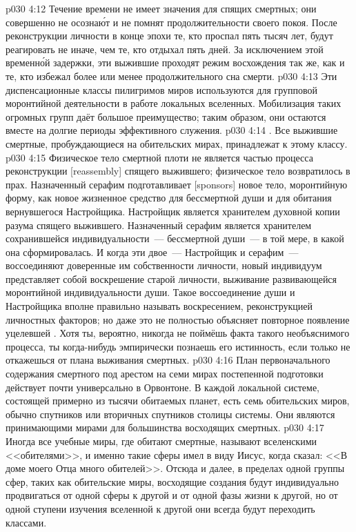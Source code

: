 \vs p030 4:12 Течение времени не имеет значения для спящих смертных; они совершенно не осозна\'ют и не помнят продолжительности своего покоя. После реконструкции личности в конце эпохи те, кто проспал пять тысяч лет, будут реагировать не иначе, чем те, кто отдыхал пять дней. За исключением этой временн\'ой задержки, эти выжившие проходят режим восхождения так же, как и те, кто избежал более или менее продолжительного сна смерти.
\vs p030 4:13 Эти диспенсационные классы пилигримов миров используются для групповой моронтийной деятельности в работе локальных вселенных. Мобилизация таких огромных групп даёт большое преимущество; таким образом, они остаются вместе на долгие периоды эффективного служения.
\vs p030 4:14 . Все выжившие смертные, пробуждающиеся на обительских мирах, принадлежат к этому классу.
\vs p030 4:15 Физическое тело смертной плоти не является частью процесса реконструкции [reassembly] спящего выжившего; физическое тело возвратилось в прах. Назначенный серафим подготавливает [sponsors] новое тело, моронтийную форму, как новое жизненное средство для бессмертной души и для обитания вернувшегося Настройщика. Настройщик является хранителем духовной копии разума спящего выжившего. Назначенный серафим является хранителем сохранившейся индивидуальности~--- бессмертной души~--- в той мере, в какой она сформировалась. И когда эти двое~--- Настройщик и серафим~--- воссоединяют доверенные им собственности личности, новый индивидуум представляет собой воскрешение старой личности, выживание развивающейся моронтийной индивидуальности души. Такое воссоединение души и Настройщика вполне правильно называть воскресением, реконструкцией личностных факторов; но даже это не полностью объясняет повторное появление уцелевшей . Хотя ты, вероятно, никогда не поймёшь факта такого необъяснимого процесса, ты когда\hyp{}нибудь эмпирически познаешь его истинность, если только не откажешься от плана выживания смертных.
\vs p030 4:16 \pc План первоначального содержания смертного под арестом на семи мирах постепенной подготовки действует почти универсально в Орвонтоне. В каждой локальной системе, состоящей примерно из тысячи обитаемых планет, есть семь обительских миров, обычно спутников или вторичных спутников столицы системы. Они являются принимающими мирами для большинства восходящих смертных.
\vs p030 4:17 Иногда все учебные миры, где обитают смертные, называют вселенскими <<обителями>>, и именно такие сферы имел в виду Иисус, когда сказал: <<В доме моего Отца много обителей>>. Отсюда и далее, в пределах одной группы сфер, таких как обительские миры, восходящие создания будут индивидуально продвигаться от одной сферы к другой и от одной фазы жизни к другой, но от одной ступени изучения вселенной к другой они всегда будут переходить классами.
